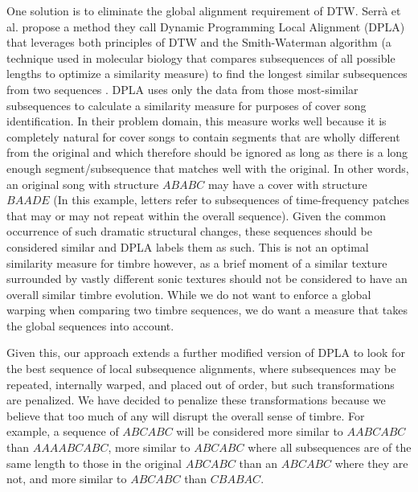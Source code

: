 \documentclass[a4paper,12pt]{report} 	%
\numberwithin{figure}{chapter}
\numberwithin{table}{chapter}
\numberwithin{equation}{chapter}
\begin{document}
\begin{flushleft}
One solution is to eliminate the global alignment requirement of DTW. Serr\`a et al. propose a method they call Dynamic Programming Local Alignment (DPLA) that leverages both principles of DTW and the Smith-Waterman algorithm (a technique used in molecular biology that compares subsequences of all possible lengths to optimize a similarity measure) to find the longest similar subsequences from two sequences \cite{serra2008chroma}. DPLA uses only the data from those most-similar subsequences to calculate a similarity measure for purposes of cover song identification. In their problem domain, this measure works well because it is completely natural for cover songs to contain segments that are wholly different from the original and which therefore should be ignored as long as there is a long enough segment/subsequence that matches well with the original. In other words, an original song with structure $ABABC$ may have a cover with structure $BAADE$ (In this example, letters refer to subsequences of time-frequency patches that may or may not repeat within the overall sequence). Given the common occurrence of such dramatic structural changes, these sequences should be considered similar and DPLA labels them as such. This is not an optimal similarity measure for timbre however, as a brief moment of a similar texture surrounded by vastly different sonic textures should not be considered to have an overall similar timbre evolution. While we do not want to enforce a global warping when comparing two timbre sequences, we do want a measure that takes the global sequences into account.

Given this, our approach extends a further modified version of DPLA to look for the best sequence of local subsequence alignments, where subsequences may be repeated, internally warped, and placed out of order, but such transformations are penalized. We have decided to penalize these transformations because we believe that too much of any will disrupt the overall sense of timbre. For example, a sequence of $ABCABC$ will be considered more similar to $AABCABC$ than $AAAABCABC$, more similar to $ABCABC$ where all subsequences are of the same length to those in the original $ABCABC$ than an $ABCABC$ where they are not, and more similar to $ABCABC$ than $CBABAC$.


\end{flushleft}
\end{document}

